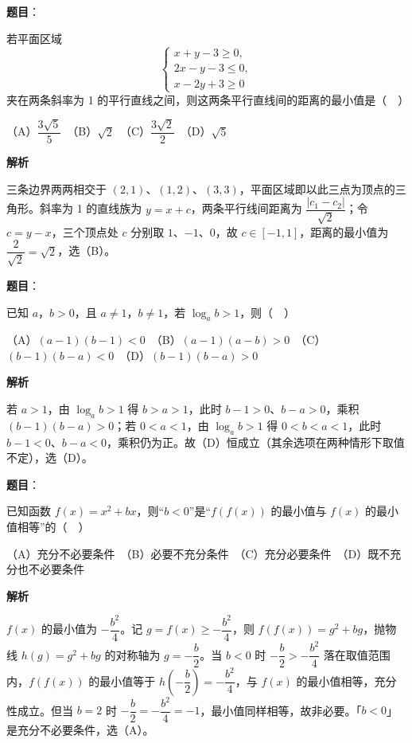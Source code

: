 \begin{answer}

\textbf{题目}：

若平面区域
\nopagebreak[4]
\[
\begin{cases}
x+y-3\geqslant 0,\\
2x-y-3\leqslant 0,\\
x-2y+3\geqslant 0
\end{cases}
\]
夹在两条斜率为 1 的平行直线之间，则这两条平行直线间的距离的最小值是（　）

（A）\(\dfrac{3\sqrt{5}}{5}\)　（B）\(\sqrt{2}\)　（C）\(\dfrac{3\sqrt{2}}{2}\)　（D）\(\sqrt{5}\)

\textbf{解析}

三条边界两两相交于 \((2,1)\)、\((1,2)\)、\((3,3)\)，平面区域即以此三点为顶点的三角形。斜率为 1 的直线族为 \(y=x+c\)，两条平行线间距离为 \(\dfrac{|c_{1}-c_{2}|}{\sqrt{2}}\)；令 \(c=y-x\)，三个顶点处 \(c\) 分别取 \(1\)、\(-1\)、\(0\)，故 \(c\in[-1,1]\)，距离的最小值为 \(\dfrac{2}{\sqrt{2}}=\sqrt{2}\)，选（B）。


\end{answer}
\begin{answer}

\textbf{题目}：

已知 \(a\)，\(b>0\)，且 \(a\neq1\)，\(b\neq1\)，若 \(\log_a b>1\)，则（　）

（A）\((a-1)(b-1)<0\)　（B）\((a-1)(a-b)>0\)　（C）\((b-1)(b-a)<0\)　（D）\((b-1)(b-a)>0\)

\textbf{解析}

若 \(a>1\)，由 \(\log_a b>1\) 得 \(b>a>1\)，此时 \(b-1>0\)、\(b-a>0\)，乘积 \((b-1)(b-a)>0\)；若 \(0<a<1\)，由 \(\log_a b>1\) 得 \(0<b<a<1\)，此时 \(b-1<0\)、\(b-a<0\)，乘积仍为正。故（D）恒成立（其余选项在两种情形下取值不定），选（D）。


\end{answer}
\begin{answer}

\textbf{题目}：

已知函数 \(f(x)=x^{2}+bx\)，则“\(b<0\)”是“\(f(f(x))\) 的最小值与 \(f(x)\) 的最小值相等”的（　）

（A）充分不必要条件　（B）必要不充分条件　（C）充分必要条件　（D）既不充分也不必要条件

\textbf{解析}

\(f(x)\) 的最小值为 \(-\dfrac{b^{2}}{4}\)。记 \(g=f(x)\geqslant-\dfrac{b^{2}}{4}\)，则 \(f(f(x))=g^{2}+bg\)，抛物线 \(h(g)=g^{2}+bg\) 的对称轴为 \(g=-\dfrac{b}{2}\)。当 \(b<0\) 时 \(-\dfrac{b}{2}>-\dfrac{b^{2}}{4}\) 落在取值范围内，\(f(f(x))\) 的最小值等于 \(h\left(-\dfrac{b}{2}\right)=-\dfrac{b^{2}}{4}\)，与 \(f(x)\) 的最小值相等，充分性成立。但当 \(b=2\) 时 \(-\dfrac{b}{2}=-\dfrac{b^{2}}{4}=-1\)，最小值同样相等，故非必要。「\(b<0\)」是充分不必要条件，选（A）。


\end{answer}
